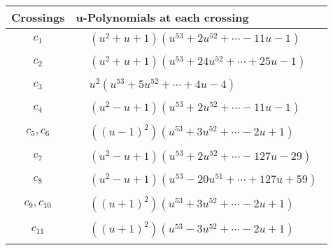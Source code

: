\documentclass[1p]{elsarticle_modified}
\theoremstyle{definition}
\begin{document}
\begin{tabular}{m{50pt}|m{274pt}}
Crossings & \hspace{64pt}u-Polynomials at each crossing \\
\hline $$\begin{aligned}c_{1}\end{aligned}$$&$\begin{aligned}
&(u^2+u+1)(u^{53}+2 u^{52}+\cdots-11 u-1)
\end{aligned}$\\
\hline $$\begin{aligned}c_{2}\end{aligned}$$&$\begin{aligned}
&(u^2+u+1)(u^{53}+24 u^{52}+\cdots+25 u-1)
\end{aligned}$\\
\hline $$\begin{aligned}c_{3}\end{aligned}$$&$\begin{aligned}
&u^2(u^{53}+5 u^{52}+\cdots+4 u-4)
\end{aligned}$\\
\hline $$\begin{aligned}c_{4}\end{aligned}$$&$\begin{aligned}
&(u^2- u+1)(u^{53}+2 u^{52}+\cdots-11 u-1)
\end{aligned}$\\
\hline $$\begin{aligned}c_{5},c_{6}\end{aligned}$$&$\begin{aligned}
&((u-1)^2)(u^{53}+3 u^{52}+\cdots-2 u+1)
\end{aligned}$\\
\hline $$\begin{aligned}c_{7}\end{aligned}$$&$\begin{aligned}
&(u^2- u+1)(u^{53}+2 u^{52}+\cdots-127 u-29)
\end{aligned}$\\
\hline $$\begin{aligned}c_{8}\end{aligned}$$&$\begin{aligned}
&(u^2- u+1)(u^{53}-20 u^{51}+\cdots+127 u+59)
\end{aligned}$\\
\hline $$\begin{aligned}c_{9},c_{10}\end{aligned}$$&$\begin{aligned}
&((u+1)^2)(u^{53}+3 u^{52}+\cdots-2 u+1)
\end{aligned}$\\
\hline $$\begin{aligned}c_{11}\end{aligned}$$&$\begin{aligned}
&((u+1)^2)(u^{53}-3 u^{52}+\cdots-2 u+1)
\end{aligned}$\\
\hline
\end{tabular}\newpage\renewcommand{\arraystretch}{1}
\end{document}
